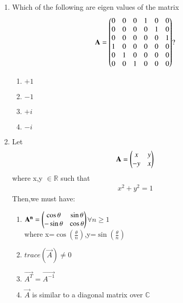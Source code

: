 \begin{enumerate}[label=\thesection.\arabic*.,ref=\thesection.\theenumi]
\begin{enumerate}
\end{enumerate}
%
%
\solution

\item Which of the following are eigen values of the matrix
\begin{align}
    \mathbf A
=\begin{pmatrix}0 &0 &0 &1 &0 &0\\0 &0 &0 &0 & 1 &0
\\ 0& 0&0 &0 &0 &1\\1& 0 &0 &0 &0 &0\\ 0& 1 &0 &0 &0 &0\\0 &0 &1 &0 &0 &0\end{pmatrix}?
\label{eq:solutions/2014/dec/86/eq:matrix}  
\end{align}
\begin{enumerate}
    \item $+1$
    \item $-1$
    \item $+i$
    \item $-i$ 
\end{enumerate}
%
\solution

\item Let
\begin{align}
    \mathbf{A}=\begin{pmatrix}x&y\\-y&x\end{pmatrix}\label{eq:solutions/2014/dec/90/1}
\end{align}
where x,y $\in \mathbb{R}$ such that
\begin{align}
    x^{2}+y^{2}=1
\end{align}
Then,we must have:
\begin{enumerate}
\item{$\mathbf{A^{n}}=\begin{pmatrix}\cos\theta& \sin\theta\\-\sin\theta& \cos\theta\end{pmatrix}$$\forall n\geq{1}$\\ where x=$\cos(\frac{\theta}{n})$,y=$\sin(\frac{\theta}{n})$}
\item{$trace(\vec{A})\neq 0$}
\item{$\vec{A^{T}}=\vec{A^{-1}}$}
\item{$\vec{A}$ is similar to a diagonal matrix over $\mathbb{C}$}
\end{enumerate}
%
%
\solution


\end{enumerate}

